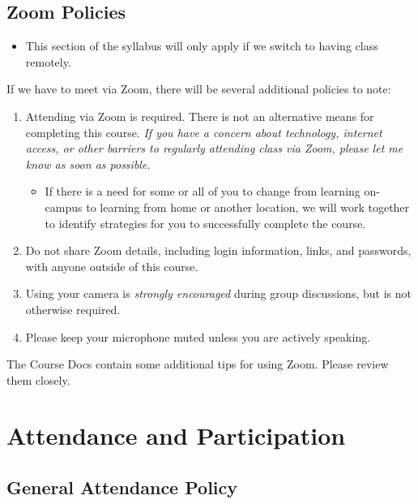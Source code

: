 \documentclass[
]{book}
\providecommand{\tightlist}{%
  \setlength{\itemsep}{0pt}\setlength{\parskip}{0pt}}
\newenvironment{rmdblock}[1]
  {\begin{shaded*}
  \begin{itemize}
  \renewcommand{\labelitemi}{
    \raisebox{-.7\height}[0pt][0pt]{
      {\setkeys{Gin}{width=3em,keepaspectratio}\texttt{[image: images/\#1]}}
    }
  }
  \item
  }
  {
  \end{itemize}
  \end{shaded*}
  }
\newenvironment{rmdwarning}
  {\begin{rmdblock}{warning}}
  {\end{rmdblock}}
\begin{document}
\hypertarget{zoom-policies}{%
\subsection{Zoom Policies}\label{zoom-policies}}

\begin{rmdwarning}
This section of the syllabus will only apply if we switch to having
class remotely.
\end{rmdwarning}

If we have to meet via Zoom, there will be several additional policies to note:

\begin{enumerate}
\def\labelenumi{\arabic{enumi}.}
\tightlist
\item
  Attending via Zoom is required. There is not an alternative means for completing this course. \emph{If you have a concern about technology, internet access, or other barriers to regularly attending class via Zoom, please let me know as soon as possible.}

  \begin{itemize}
  \tightlist
  \item
    If there is a need for some or all of you to change from learning on-campus to learning from home or another location, we will work together to identify strategies for you to successfully complete the course.
  \end{itemize}
\item
  Do not share Zoom details, including login information, links, and passwords, with anyone outside of this course.
\item
  Using your camera is \emph{strongly encouraged} during group discussions, but is not otherwise required.
\item
  Please keep your microphone muted unless you are actively speaking.
\end{enumerate}

The Course Docs contain some additional tips for using Zoom. Please review them closely.

\hypertarget{attendance-and-participation}{%
\section{Attendance and Participation}\label{attendance-and-participation}}

\hypertarget{general-attendance-policy}{%
\subsection{General Attendance Policy}\label{general-attendance-policy}}
\end{document}
